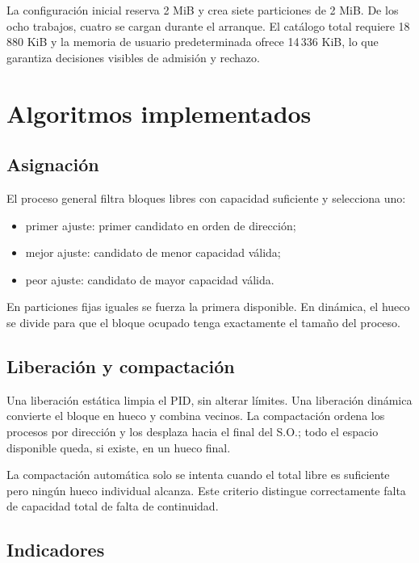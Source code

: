 \documentclass[11pt,a4paper]{article}
\begin{document}
La configuración inicial reserva 2 MiB y crea siete particiones de 2 MiB. De los
ocho trabajos, cuatro se cargan durante el arranque. El catálogo total requiere
18\,880 KiB y la memoria de usuario predeterminada ofrece 14\,336 KiB, lo que
garantiza decisiones visibles de admisión y rechazo.

\section{Algoritmos implementados}

\subsection{Asignación}

El proceso general filtra bloques libres con capacidad suficiente y selecciona uno:

\begin{itemize}
  \item primer ajuste: primer candidato en orden de dirección;
  \item mejor ajuste: candidato de menor capacidad válida;
  \item peor ajuste: candidato de mayor capacidad válida.
\end{itemize}

En particiones fijas iguales se fuerza la primera disponible. En dinámica, el hueco
se divide para que el bloque ocupado tenga exactamente el tamaño del proceso.

\subsection{Liberación y compactación}

Una liberación estática limpia el PID, sin alterar límites. Una liberación dinámica
convierte el bloque en hueco y combina vecinos. La compactación ordena los procesos
por dirección y los desplaza hacia el final del S.O.; todo el espacio disponible
queda, si existe, en un hueco final.

La compactación automática solo se intenta cuando el total libre es suficiente
pero ningún hueco individual alcanza. Este criterio distingue correctamente falta
de capacidad total de falta de continuidad.

\subsection{Indicadores}
\end{document}
